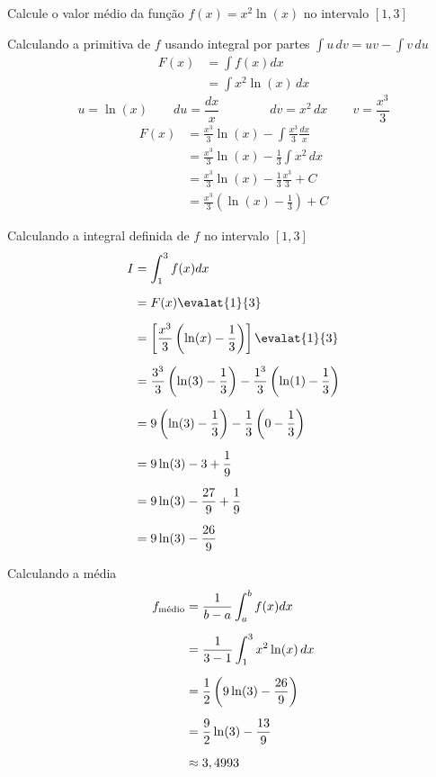 \documentclass[a4paper,12pt,fleqn]{article}
\begin{document}

Calcule o valor médio da função \(f(x)=x^2\ln(x)\) no intervalo \([1, 3]\)

\begin{answer}
  Calculando a primitiva de $f$ usando integral por partes
  \(\int u\,dv = uv - \int v\,du\)
  \begin{align*}
    F(x) & = \int f(x) dx \\[2mm]
         & = \int x^2\ln(x)\, dx
  \end{align*}
  \[
    u = \ln(x)
    \qquad
    du = \frac{dx}{x}
    \qquad\qquad
    dv = x^2\, dx
    \qquad
    v = \frac{x^3}{3}
  \]
  \begin{align*}
    F(x) & = \frac{x^3}{3}\ln(x) - \int \frac{x^3}{3} \frac{dx}{x}\\[2mm]
         & = \frac{x^3}{3}\ln(x) - \frac{1}{3} \int x^2 \,dx\\[2mm]
         & = \frac{x^3}{3}\ln(x) - \frac{1}{3} \frac{x^3}{3} + C \\[2mm]
         & = \frac{x^3}{3}\left(\ln(x) -\frac{1}{3}\right) + C
  \end{align*}

  Calculando a integral definida de $f$ no intervalo \([1, 3]\)
  \begin{align*}
    I & = \int_1^3 f(x) dx   \\[2mm]
      & = F(x) \evalat{1}{3} \\[2mm]
      & = \left[\frac{x^3}{3}\left(\ln(x) -\frac{1}{3}\right)\right] \evalat{1}{3} \\[2mm]
      & = \frac{3^3}{3}\left(\ln(3) -\frac{1}{3}\right)
        - \frac{1^3}{3}\left(\ln(1) -\frac{1}{3}\right) \\[2mm]
      & = 9\left(\ln(3) -\frac{1}{3}\right)
        - \frac{1}{3}\left(0 -\frac{1}{3}\right) \\[2mm]
      & = 9\ln(3) -3 + \frac{1}{9}   \\[2mm]
      & = 9\ln(3) -\frac{27}{9} + \frac{1}{9}  \\[2mm]
      & = 9\ln(3) -\frac{26}{9}
  \end{align*}

  Calculando a média
  \begin{align*}
    \fmedio & = \frac{1}{b-a} \int_a^b f(x)dx \\[2mm]
            & = \frac{1}{3-1} \int_1^3 x^2\ln(x)\,dx \\[2mm]
            & = \frac{1}{2} \left(9\ln(3) -\frac{26}{9}\right) \\[2mm]
            & = \frac{9}{2}\ln(3) -\frac{13}{9} \\[2mm]
            & \approx 3,4993
  \end{align*}
\end{answer}
\end{document}
